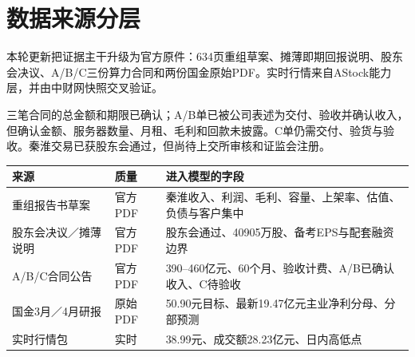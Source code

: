 \section{数据来源分层}

本轮更新把证据主干升级为官方原件：634页重组草案、摊薄即期回报说明、股东会决议、A/B/C三份算力合同和两份国金原始PDF。实时行情来自AStock能力层，并由中财网快照交叉验证。

\begin{sourcequalitybox}[证据边界]
三笔合同的总金额和期限已确认；A/B单已被公司表述为交付、验收并确认收入，但确认金额、服务器数量、月租、毛利和回款未披露。C单仍需交付、验货与验收。秦淮交易已获股东会通过，但尚待上交所审核和证监会注册。
\end{sourcequalitybox}

\begin{exhibitbox}[本轮新增证据]
\noindent\begin{tabularx}{\textwidth}{L{3.0cm}L{2.2cm}X}
\toprule
\textbf{来源} & \textbf{质量} & \textbf{进入模型的字段} \\
\midrule
重组报告书草案 & 官方PDF & 秦淮收入、利润、毛利、容量、上架率、估值、负债与客户集中 \\
股东会决议／摊薄说明 & 官方PDF & 股东会通过、40905万股、备考EPS与配套融资边界 \\
A/B/C合同公告 & 官方PDF & 390--460亿元、60个月、验收计费、A/B已确认收入、C待验收 \\
国金3月／4月研报 & 原始PDF & 50.90元目标、最新19.47亿元主业净利分母、分部预测 \\
实时行情包 & 实时 & 38.99元、成交额28.23亿元、日内高低点 \\
\bottomrule
\end{tabularx}
\end{exhibitbox}

